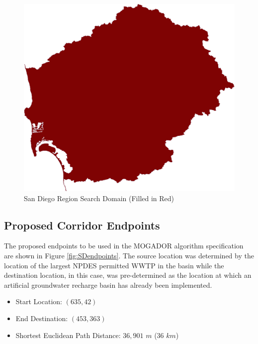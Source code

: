         \begin{figure}[!h]
            \begin{center}
            \includegraphics[width=5.5in]{figures/SanDiego_SearchDomain.png}   
            \caption{San Diego Region Search Domain (Filled in Red)}
            \label{fig:SDdomain}
            \end{center}
        \end{figure}

    \subsection{Proposed Corridor Endpoints}
    
The proposed endpoints to be used in the MOGADOR algorithm specification are shown in Figure \ref{fig:SDendpoints}. The source location was determined by the location of the largest NPDES permitted WWTP in the basin while the destination location, in this case, was pre-determined as the location at which an artificial groundwater recharge basin has already been implemented.
    
    \begin{itemize}
      \setlength{\itemsep}{0cm}
      \setlength{\parskip}{0cm}
        \item Start Location: $(635,42)$
        \item End Destination: $(453,363)$    
        \item Shortest Euclidean Path Distance: $36,901$ $m$ ($36$ $km$)
    \end{itemize}
    
